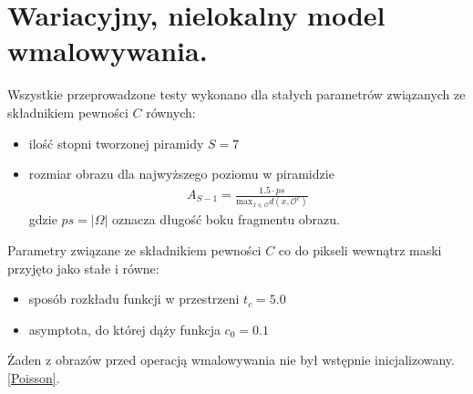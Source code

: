 \documentclass[12pt, twoside, openany]{report}
\theoremstyle{definition}
\begin{document}
\section{Wariacyjny, nielokalny model wmalowywania.}
Wszystkie przeprowadzone testy wykonano dla stałych parametrów związanych ze składnikiem pewności $C$ równych:
\begin{itemize}
\item
ilość stopni tworzonej piramidy $S=7$
\item
rozmiar obrazu dla najwyższego poziomu w piramidzie 
\begin{align}
A_{S-1}=\frac{1.5 \cdot ps}{\mathrm{max}_{x \in \mathcal{O}}d(x,\mathcal{O}^{c})}
\end{align}
gdzie $ps = |\Omega|$ oznacza długość boku fragmentu obrazu.
\end{itemize}
Parametry związane ze składnikiem pewności $C$ co do pikseli wewnątrz maski przyjęto jako stałe i równe:
\begin{itemize}
\item
sposób rozkładu funkcji w przestrzeni $t_{c}=5.0$
\item 
asymptota, do której dąży funkcja $c_{0}=0.1$
\end{itemize}
Żaden z obrazów przed operacją wmalowywania nie był wstępnie inicjalizowany. \eqref{Poisson}.
\end{document}
